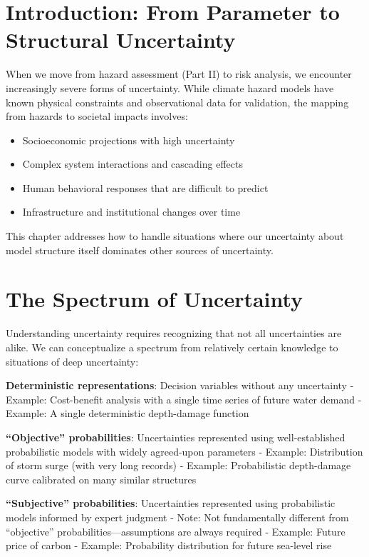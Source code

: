 \documentclass[
  letterpaper,
  DIV=11,
  numbers=noendperiod]{scrreprt}
\providecommand{\tightlist}{%
  \setlength{\itemsep}{0pt}\setlength{\parskip}{0pt}}
\begin{document}
\section{Introduction: From Parameter to Structural
Uncertainty}\label{introduction-from-parameter-to-structural-uncertainty}

When we move from hazard assessment (Part II) to risk analysis, we
encounter increasingly severe forms of uncertainty. While climate hazard
models have known physical constraints and observational data for
validation, the mapping from hazards to societal impacts involves:

\begin{itemize}
\tightlist
\item
  Socioeconomic projections with high uncertainty
\item
  Complex system interactions and cascading effects
\item
  Human behavioral responses that are difficult to predict
\item
  Infrastructure and institutional changes over time
\end{itemize}

This chapter addresses how to handle situations where our uncertainty
about model structure itself dominates other sources of uncertainty.

\section{The Spectrum of Uncertainty}\label{the-spectrum-of-uncertainty}

Understanding uncertainty requires recognizing that not all
uncertainties are alike. We can conceptualize a spectrum from relatively
certain knowledge to situations of deep uncertainty:

\textbf{Deterministic representations}: Decision variables without any
uncertainty - Example: Cost-benefit analysis with a single time series
of future water demand - Example: A single deterministic depth-damage
function

\textbf{``Objective'' probabilities}: Uncertainties represented using
well-established probabilistic models with widely agreed-upon parameters
- Example: Distribution of storm surge (with very long records) -
Example: Probabilistic depth-damage curve calibrated on many similar
structures

\textbf{``Subjective'' probabilities}: Uncertainties represented using
probabilistic models informed by expert judgment - Note: Not
fundamentally different from ``objective'' probabilities---assumptions
are always required - Example: Future price of carbon - Example:
Probability distribution for future sea-level rise
\end{document}
